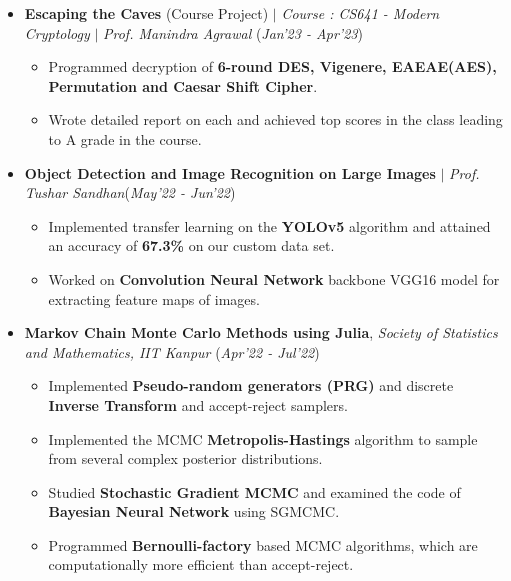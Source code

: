 \documentclass[10pt]{extarticle}
\begin{document}
\begin{itemize}
\item \textbf{Escaping the Caves} (Course Project) $|$ \textit{\small{Course : CS641 - Modern Cryptology}} $|$ \textit{\small{Prof. Manindra Agrawal}} \hfill\hfill(\textit{Jan'23 -  Apr'23})\\
\begin{itemize}[leftmargin=2mm]
\item Programmed decryption of \textbf{6-round DES, Vigenere, EAEAE(AES), Permutation and Caesar Shift Cipher}.
\item Wrote detailed report on each and achieved top scores in the class leading to A grade in the course.
\end{itemize}

\item \textbf{Object Detection and Image Recognition on Large Images} $|$ \textit{\small{Prof. Tushar Sandhan}}\hfill\hfill(\textit{May'22 - Jun'22})
\begin{itemize}[leftmargin=2mm]
\item Implemented transfer learning on the \textbf{YOLOv5} algorithm and attained an accuracy of \textbf{67.3\%} on our custom data set.
\item Worked on \textbf{Convolution Neural Network} backbone VGG16 model for extracting feature maps of images.
\end{itemize}

\item \textbf{Markov Chain Monte Carlo Methods using Julia}, \textit{\small Society of Statistics and Mathematics, IIT Kanpur} \href{https://github.com/LaveshM/mcmc-methods-in-julia-1}{\faGithub}\hfill\hfill(\textit{Apr'22 - Jul'22})
\begin{itemize}[leftmargin=2mm]
\item Implemented \textbf{Pseudo-random generators (PRG)} and discrete \textbf{Inverse Transform} and accept-reject samplers.
\item Implemented the MCMC \textbf{Metropolis-Hastings} algorithm to sample from several complex posterior distributions.
\item Studied \textbf{Stochastic Gradient MCMC} and examined the code of \textbf{Bayesian Neural Network} using SGMCMC.
\item Programmed \textbf{Bernoulli-factory} based MCMC algorithms, which are computationally more efficient than accept-reject.
\end{itemize}

\end{itemize}
\end{document}

